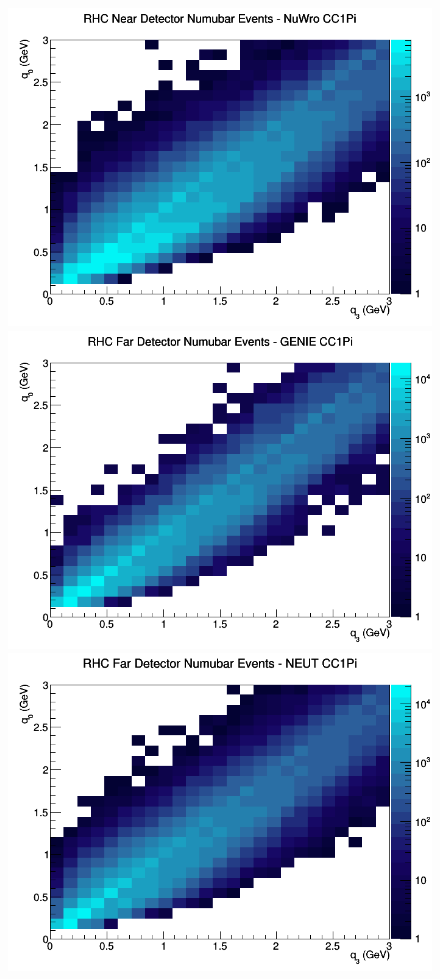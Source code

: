 \documentclass[12pt]{article}
\begin{document}
\begin{figure}[h]
\includegraphics[width=\linewidth]{eff_q0_q3/GAr/CC1Pi_RHC_ND_numubar_q3_q0_NuWro.png}
\endminipage
\newline
{}
\includegraphics[width=\linewidth]{eff_q0_q3/GAr/CC1Pi_RHC_FD_numubar_q3_q0_GENIE.png}
\endminipage
{}
\includegraphics[width=\linewidth]{eff_q0_q3/GAr/CC1Pi_RHC_FD_numubar_q3_q0_NEUT.png}

\end{figure}
\end{document}
